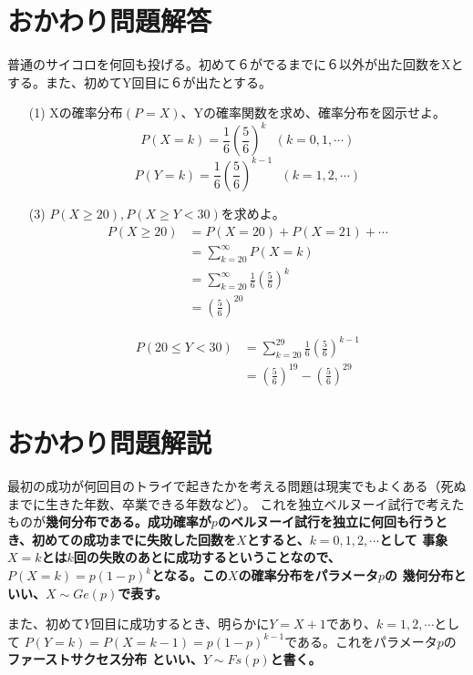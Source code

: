 \documentclass[a4j,uplatex]{jsarticle}
\begin{document}
\section*{おかわり問題解答}
普通のサイコロを何回も投げる。初めて６がでるまでに６以外が出た回数をXとする。また、初めてY回目に６が出たとする。
\begin{itemize}
  \item[(1)] Xの確率分布$(P=X)$、Yの確率関数を求め、確率分布を図示せよ。
  \\ 
  \begin{equation}
    P(X=k)=\frac{1}{6} \left(\frac{5}{6}\right)^{k}~~~(k=0,1,\cdots)
  \end{equation}
  \begin{equation}
    P(Y=k)=\frac{1}{6}\left(\frac{5}{6}\right)^{k-1}~~~(k=1,2,\cdots)
  \end{equation}
  \item[(3)] $ P(X\ge20) , P(X\ge Y<30) $を求めよ。 
  \begin{equation}
    \begin{split}
      P(X\ge20)&=P(X=20)+P(X=21)+\cdots \\
      &=\sum_{k=20}^{\infty}P(X=k) \\
      &=\sum_{k=20}^{\infty}\frac{1}{6}\left(\frac{5}{6}\right)^k \\
      &=\left(\frac{5}{6}\right)^{20}
    \end{split}
  \end{equation} 

  \begin{equation}
    \begin{split}
      P(20\le Y<30)&=\sum_{k=20}^{29}\frac{1}{6}\left(\frac{5}{6}\right)^{k-1} \\
      &=\left(\frac{5}{6}\right)^{19} - \left(\frac{5}{6}\right)^{29}
    \end{split}
  \end{equation} 
\end{itemize}

\section*{おかわり問題解説}
最初の成功が何回目のトライで起きたかを考える問題は現実でもよくある（死ぬまでに生きた年数、卒業できる年数など）。
これを独立ベルヌーイ試行で考えたものが\bf 幾何分布\rm である。成功確率が$p$のベルヌーイ試行を独立に何回も行うとき、初めての成功までに失敗した回数を$X$とすると、$ k=0,1,2,\cdots $として
事象$X=k$とは$k$回の失敗のあとに成功するということなので、$ P(X=k)=p(1-p)^k $となる。この$X$の確率分布をパラメータ$p$の
幾何分布といい、$X \sim Ge(p)$で表す。
\par また、初めて$Y$回目に成功するとき、明らかに$Y=X+1$であり、$ k=1,2,\cdots $として
$P(Y=k)=P(X=k-1)=p(1-p)^{k-1}$である。これをパラメータ$p$の\bf ファーストサクセス分布 \rm といい、$Y\sim Fs(p)$と書く。
\end{document}
